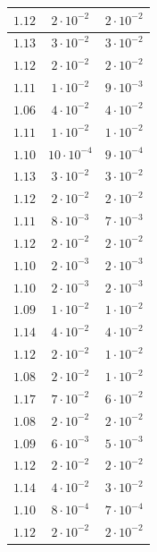 \begin{table}[h]
\begin{tabular}{|c|c|c|}
       \hline
       $1.12$ & $2 \cdot 10^{-2}$ & $2 \cdot 10^{-2}$ \\
       \hline
       $1.13$ & $3 \cdot 10^{-2}$ & $3 \cdot 10^{-2}$ \\
       \hline
       $1.12$ & $2 \cdot 10^{-2}$ & $2 \cdot 10^{-2}$ \\
       \hline
       $1.11$ & $1 \cdot 10^{-2}$ & $9 \cdot 10^{-3}$ \\
       \hline
       $1.06$ & $4 \cdot 10^{-2}$ & $4 \cdot 10^{-2}$ \\
       \hline
       $1.11$ & $1 \cdot 10^{-2}$ & $1 \cdot 10^{-2}$ \\
       \hline
       $1.10$ & $10 \cdot 10^{-4}$ & $9 \cdot 10^{-4}$ \\
       \hline
       $1.13$ & $3 \cdot 10^{-2}$ & $3 \cdot 10^{-2}$ \\
       \hline
       $1.12$ & $2 \cdot 10^{-2}$ & $2 \cdot 10^{-2}$ \\
       \hline
       $1.11$ & $8 \cdot 10^{-3}$ & $7 \cdot 10^{-3}$ \\
       \hline
       $1.12$ & $2 \cdot 10^{-2}$ & $2 \cdot 10^{-2}$ \\
       \hline
       $1.10$ & $2 \cdot 10^{-3}$ & $2 \cdot 10^{-3}$ \\
       \hline
       $1.10$ & $2 \cdot 10^{-3}$ & $2 \cdot 10^{-3}$ \\
       \hline
       $1.09$ & $1 \cdot 10^{-2}$ & $1 \cdot 10^{-2}$ \\
       \hline
       $1.14$ & $4 \cdot 10^{-2}$ & $4 \cdot 10^{-2}$ \\
       \hline
       $1.12$ & $2 \cdot 10^{-2}$ & $1 \cdot 10^{-2}$ \\
       \hline
       $1.08$ & $2 \cdot 10^{-2}$ & $1 \cdot 10^{-2}$ \\
       \hline
       $1.17$ & $7 \cdot 10^{-2}$ & $6 \cdot 10^{-2}$ \\
       \hline
       $1.08$ & $2 \cdot 10^{-2}$ & $2 \cdot 10^{-2}$ \\
       \hline
       $1.09$ & $6 \cdot 10^{-3}$ & $5 \cdot 10^{-3}$ \\
       \hline
       $1.12$ & $2 \cdot 10^{-2}$ & $2 \cdot 10^{-2}$ \\
       \hline
       $1.14$ & $4 \cdot 10^{-2}$ & $3 \cdot 10^{-2}$ \\
       \hline
       $1.10$ & $8 \cdot 10^{-4}$ & $7 \cdot 10^{-4}$ \\
       \hline
       $1.12$ & $2 \cdot 10^{-2}$ & $2 \cdot 10^{-2}$ \\
       \hline
   \end{tabular}
\end{table}


